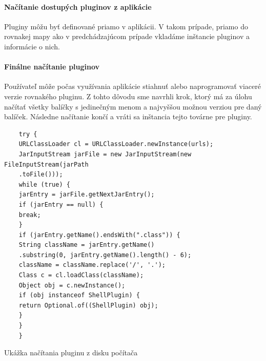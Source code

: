 {\paragraph{Načítanie dostupých pluginov z aplikácie}
\indent Pluginy môžu byť definované priamo v aplikácii. V takom prípade, priamo do rovnakej mapy ako v predchádzajúcom prípade vkladáme inštancie pluginov a informácie o nich. 
\paragraph{Finálne načítanie pluginov}
\indent Používateľ môže počas využívania aplikácie stiahnuť alebo naprogramovať viaceré verzie rovnakého pluginu. Z tohto dôvodu sme navrhli  krok, ktorý má za úlohu načítať všetky balíčky s jedinečným menom a najvyššou možnou verziou pre daný balíček. Následne načítanie končí a vráti sa inštancia tejto továrne pre pluginy.
\begin{algorithm}[H]
	\begin{verbatim}
	try {
	URLClassLoader cl = URLClassLoader.newInstance(urls);
	JarInputStream jarFile = new JarInputStream(new FileInputStream(jarPath
	.toFile()));
	while (true) {
	jarEntry = jarFile.getNextJarEntry();
	if (jarEntry == null) {
	break;
	}
	if (jarEntry.getName().endsWith(".class")) {
	String className = jarEntry.getName()
	.substring(0, jarEntry.getName().length() - 6);
	className = className.replace('/', '.');
	Class c = cl.loadClass(className);
	Object obj = c.newInstance();
	if (obj instanceof ShellPlugin) {
	return Optional.of((ShellPlugin) obj);
	}
	}
	}
	\end{verbatim}
	\caption{Ukážka načítania pluginu z disku počítača}
	\label{alg:gen}
\end{algorithm}

}
